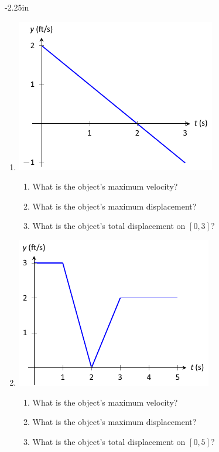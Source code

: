 \begin{adjustwidth*}{}{-2.25in}
\setlength{\columnsep}{25pt}
\begin{multicols*}{2}\small


\begin{enumerate}[1),start=5]
\item \begin{minipage}{\linewidth}
\includegraphics[scale=.8]{figures/fig05_02_ex_14}
\end{minipage}
\begin{enumerate}
\item		What is the object's maximum velocity?
\item		What is the object's maximum displacement?
\item		What is the object's total displacement on $[0,3]$?
\end{enumerate}

\item \begin{minipage}{\linewidth}
\includegraphics[scale=.8]{figures/fig05_02_ex_15}
\end{minipage}
\begin{enumerate}
\item		What is the object's maximum velocity?
\item		What is the object's maximum displacement?
\item		What is the object's total displacement on $[0,5]$?
\end{enumerate}


\end{enumerate}
\end{multicols*}
\end{adjustwidth*}
